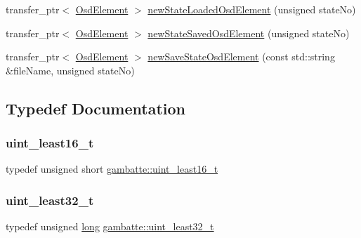 \begin{DoxyCompactItemize}
\item 
transfer\+\_\+ptr$<$ \hyperlink{classgambatte_1_1OsdElement}{Osd\+Element} $>$ \hyperlink{namespacegambatte_a390e2b59815cfe5fcb669ee0e922813b}{new\+State\+Loaded\+Osd\+Element} (unsigned state\+No)
\item 
transfer\+\_\+ptr$<$ \hyperlink{classgambatte_1_1OsdElement}{Osd\+Element} $>$ \hyperlink{namespacegambatte_abe8d300e4073eaf914b3aa4659c409c3}{new\+State\+Saved\+Osd\+Element} (unsigned state\+No)
\item 
transfer\+\_\+ptr$<$ \hyperlink{classgambatte_1_1OsdElement}{Osd\+Element} $>$ \hyperlink{namespacegambatte_a1371486452b5f3516b9925c72febc9c4}{new\+Save\+State\+Osd\+Element} (const std\+::string \&file\+Name, unsigned state\+No)
\end{DoxyCompactItemize}


\subsection{Typedef Documentation}
\mbox{\label{namespacegambatte_a96dc34dacb6f21ab43c4a9f371134ec8}} 
\subsubsection{\texorpdfstring{uint\+\_\+least16\+\_\+t}{uint\_least16\_t}}
{\footnotesize\ttfamily typedef unsigned short \hyperlink{namespacegambatte_a96dc34dacb6f21ab43c4a9f371134ec8}{gambatte\+::uint\+\_\+least16\+\_\+t}}

\mbox{\label{namespacegambatte_a0639f09fccfbbd5a8e0796318768e370}} 
\subsubsection{\texorpdfstring{uint\+\_\+least32\+\_\+t}{uint\_least32\_t}}
{\footnotesize\ttfamily typedef unsigned \hyperlink{ioapi_8h_a3c7b35ad9dab18b8310343c201f7b27e}{long} \hyperlink{namespacegambatte_a0639f09fccfbbd5a8e0796318768e370}{gambatte\+::uint\+\_\+least32\+\_\+t}}



